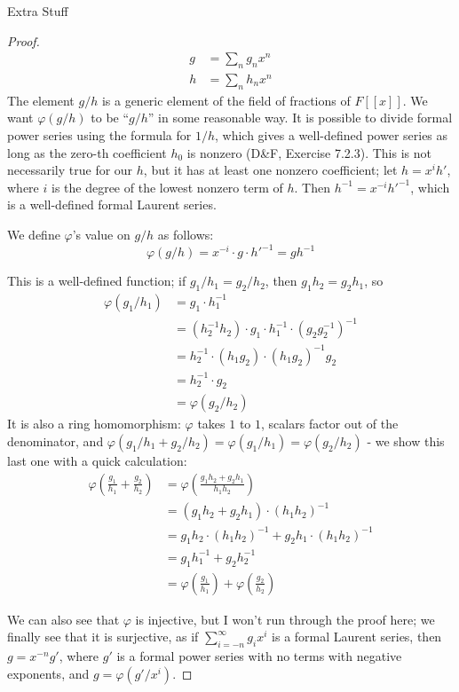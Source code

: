 \documentclass[12pt]{article}
\theoremstyle{definition}
\begin{document}
\begin{section}{Extra Stuff}
\begin{proof}
		\begin{align*}
			g &= \sum_n g_nx^n\\
			h &= \sum_n h_nx^n
		\end{align*}
		The element $g/h$ is a generic element of the field of fractions of $F[ [x]]$. We want $\varphi(g/h)$ to be ``$g/h$'' in some reasonable way. It is possible to divide formal power series using the formula for $1/h$, which gives a well-defined power series as long as the zero-th coefficient $h_0$ is nonzero (D\&F, Exercise 7.2.3). This is not necessarily true for our $h$, but it has at least one nonzero coefficient; let $h = x^{i}h'$, where $i$ is the degree of the lowest nonzero term of $h$. Then $h^{-1} = x^{-i}h'^{-1}$, which is a well-defined formal Laurent series.
		\par We define $\varphi$'s value on $g/h$ as follows:
		\[\varphi(g/h) = x^{-i}\cdot g\cdot h'^{-1} = gh^{-1}\]
		\par This is a well-defined function; if $g_1/h_1 = g_2/h_2$, then $g_1h_2 = g_2h_1$, so
		\begin{align*}
			\varphi(g_1/h_1) &= g_1 \cdot h_1^{-1}\\
			&= (h_2^{-1}h_2)\cdot g_1 \cdot h_1^{-1} \cdot (g_2g_2^{-1})^{-1}\\
			&= h_2^{-1} \cdot (h_1 g_2) \cdot  (h_1 g_2)^{-1} g_2\\
		&= h_2^{-1} \cdot g_2\\
		&= \varphi(g_2/h_2)
		\end{align*}
		It is also a ring homomorphism: $\varphi$ takes $1$ to $1$, scalars factor out of the denominator, and $\varphi(g_1/h_1 + g_2/h_2) = \varphi(g_1/h_1) = \varphi(g_2/h_2)$ - we show this last one with a quick calculation:
		\begin{align*}
			\varphi\left( \frac{g_1}{h_1} + \frac{g_2}{h_2} \right) &= \varphi\left( \frac{g_1h_2 + g_2h_1}{h_1h_2} \right)\\
			&= (g_1h_2 + g_2h_1) \cdot (h_1h_2)^{-1}\\
			&= g_1h_2 \cdot (h_1h_2)^{-1}  +  g_2h_1 \cdot (h_1h_2)^{-1}\\
			&= g_1h_1^{-1} + g_2h_2^{-1}\\
			&= \varphi\left( \frac{g_1}{h_1} \right) + \varphi\left( \frac{g_2}{h_2} \right)
		\end{align*}
		\par We can also see that $\varphi$ is injective, but I won't run through the proof here; we finally see that it is surjective, as if $\sum_{i=-n}^{\infty}g_ix^i$ is a formal Laurent series, then $g = x^{-n}g'$, where $g'$ is a formal power series with no terms with negative exponents, and $g = \varphi(g'/x^i)$.

\end{proof}
\end{section}
\end{document}
